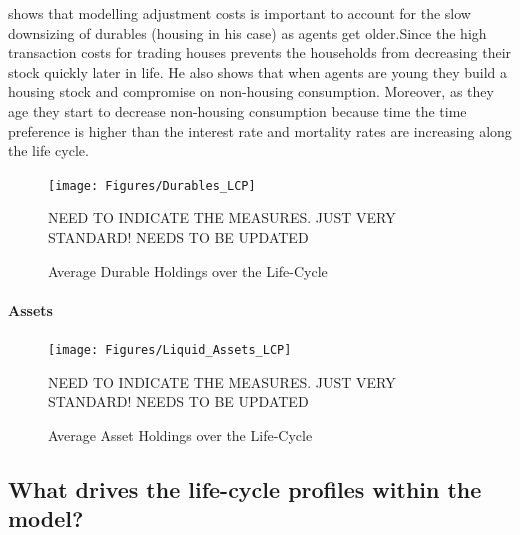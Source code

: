\documentclass[a4paper,12pt]{article}
\begin{document}
\cite{yang2009} shows that modelling adjustment costs is important to account for the slow downsizing of durables (housing in his case) as agents get older.Since the high transaction costs for trading houses prevents the households from decreasing their stock quickly later in life. He also shows that when agents are young they build a housing stock and compromise on non-housing consumption. Moreover, as they age they start to decrease non-housing consumption because  time the time preference is higher than the interest rate and mortality rates are increasing along the life cycle. 


\begin{figure}[!htbp]
\caption{Average Durable Holdings over the Life-Cycle} 
\label{Durable_LCP}	%
\centering
\texttt{[image: Figures/Durables\_LCP]}  %

\begin{minipage}{0.8\linewidth}
\footnotesize{NEED TO INDICATE THE MEASURES. JUST VERY STANDARD! NEEDS TO BE UPDATED}
\end{minipage}

\end{figure}

\paragraph{Assets}

\begin{figure}
\caption{Average Asset Holdings over the Life-Cycle} 
\label{Asset_LCP}	%
\centering
\texttt{[image: Figures/Liquid\_Assets\_LCP]}  %

\begin{minipage}{0.8\linewidth}
\footnotesize{NEED TO INDICATE THE MEASURES. JUST VERY STANDARD! NEEDS TO BE UPDATED}
\end{minipage}

\end{figure}


\subsection{What drives the life-cycle profiles within the model?}
\end{document}
